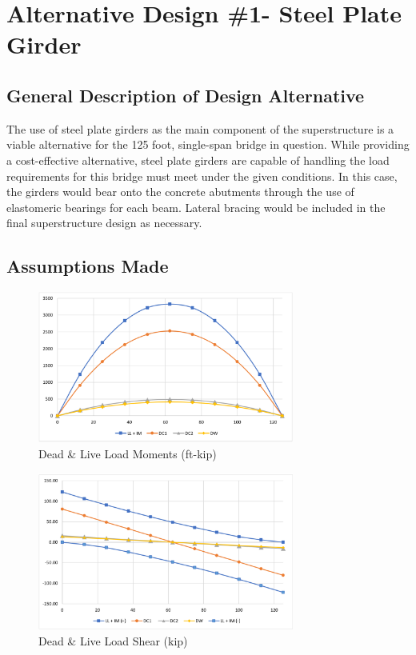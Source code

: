 \chapter{Alternative Design \#1- Steel Plate Girder}\label{sec:2}

\section{General Description of Design Alternative}\label{sec:2.1}

The use of steel plate girders as the main component of the superstructure is a viable alternative for the 125 foot, single-span bridge in question. While providing a cost-effective alternative, steel plate girders are capable of handling the load requirements for this bridge must meet under the given conditions. In this case, the girders would bear onto the concrete abutments through the use of elastomeric bearings for each beam. Lateral bracing would be included in the final superstructure design as necessary.

\section{Assumptions Made}\label{sec:2.2}


\begin{figure}[H]
\centering
\includegraphics[width=0.75\textwidth]{./appendix/figures/DeadLiveMoment.PNG}
\caption[Alternative Design \#1- Steel Plate Girder: Dead \& Live Load Moments]
{Dead \& Live Load Moments (ft-kip)}\label{fig:dlmome}
\end{figure}

\begin{figure}[H]
	\centering
	\includegraphics[width=0.75\textwidth]{./appendix/figures/DeadLiveShear.PNG}
	\caption[Alternative Design \#1- Steel Plate Girder: Dead \& Live Load Shears]
	{Dead \& Live Load Shear (kip)}\label{fig:dlshear}
\end{figure}


